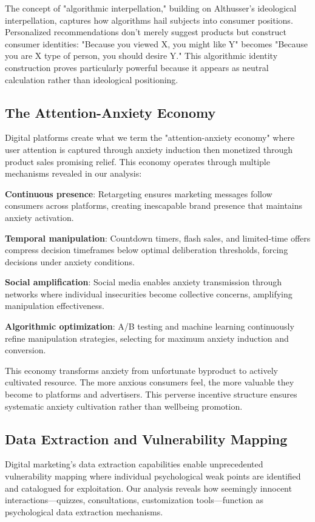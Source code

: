 The concept of "algorithmic interpellation," building on Althusser's ideological interpellation, captures how algorithms hail subjects into consumer positions. Personalized recommendations don't merely suggest products but construct consumer identities: "Because you viewed X, you might like Y" becomes "Because you are X type of person, you should desire Y." This algorithmic identity construction proves particularly powerful because it appears as neutral calculation rather than ideological positioning.

\subsection{The Attention-Anxiety Economy}

Digital platforms create what we term the "attention-anxiety economy" where user attention is captured through anxiety induction then monetized through product sales promising relief. This economy operates through multiple mechanisms revealed in our analysis:

\textbf{Continuous presence}: Retargeting ensures marketing messages follow consumers across platforms, creating inescapable brand presence that maintains anxiety activation.

\textbf{Temporal manipulation}: Countdown timers, flash sales, and limited-time offers compress decision timeframes below optimal deliberation thresholds, forcing decisions under anxiety conditions.

\textbf{Social amplification}: Social media enables anxiety transmission through networks where individual insecurities become collective concerns, amplifying manipulation effectiveness.

\textbf{Algorithmic optimization}: A/B testing and machine learning continuously refine manipulation strategies, selecting for maximum anxiety induction and conversion.

This economy transforms anxiety from unfortunate byproduct to actively cultivated resource. The more anxious consumers feel, the more valuable they become to platforms and advertisers. This perverse incentive structure ensures systematic anxiety cultivation rather than wellbeing promotion.

\subsection{Data Extraction and Vulnerability Mapping}

Digital marketing's data extraction capabilities enable unprecedented vulnerability mapping where individual psychological weak points are identified and catalogued for exploitation. Our analysis reveals how seemingly innocent interactions—quizzes, consultations, customization tools—function as psychological data extraction mechanisms.

